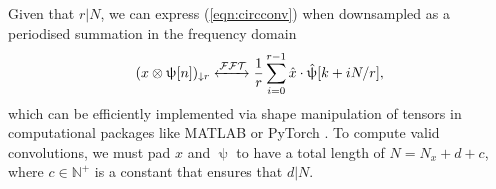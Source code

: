 \documentclass[journal]{IEEEtran}
\newcommand{\vect}[1]{\boldsymbol{\mathbf{#1}}}
\begin{document}
Given that $r|N$, we can express (\ref{eqn:circconv}) when downsampled as a periodised summation \cite{waveletsandsubbandcoding} in the frequency domain
\begin{equation}
    (x \otimes \uppsi [n])_{\downarrow r} \xleftrightarrow{\mathcal{FFT}}  \frac{1}{r} \sum_{i=0}^{r-1} \hat{x} \cdot \hat{\uppsi} [k + iN/r], %
\end{equation}
which can be efficiently implemented via shape manipulation of tensors in computational packages like MATLAB or PyTorch \cite{pytorch}. To compute valid convolutions, we must pad $x$ and $\uppsi$ to have a total length of $N = N_x + d + c$, where $c \in \mathbb{N}^+$ is a constant that ensures that $d | N$. 




\end{document}
